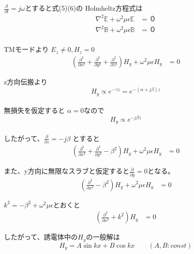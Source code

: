 \documentclass[a4paper,10pt]{bxjsarticle}
\begin{document}
$\frac{\partial}{\partial t} = j\omega$とすると式(5)(6)の Holmheltz方程式は
\begin{align*}
    \nabla^2 \mathbb{E} + \omega^2 \mu \epsilon \mathbb{E} &= ０ \\
    \nabla^2 \mathbb{B} + \omega^2 \mu \epsilon \mathbb{B} &= ０ \\
\end{align*}

TMモードより $E_z \neq 0, H_z = 0$
\begin{align*}
    \left( 
        \frac{\partial^2}{\partial x^2} 
        + \frac{\partial^2}{\partial y^2} 
        + \frac{\partial^2}{\partial z^2} 
    \right) H_y
    + \omega^2 \mu \epsilon H_y
    &= 0    
\end{align*}

z方向伝搬より $$H_y \propto e^{-\gamma z} = e^{-(\alpha + j \beta)z}$$ \\
無損失を仮定すると $\alpha = 0$なので $$H_y \propto e^{ -j \beta z}$$ \\
したがって、$ \frac{\partial}{\partial z} = -j \beta $ とすると
\begin{align*} 
    \left( 
        \frac{\partial^2}{\partial x^2} 
        + \frac{\partial^2}{\partial y^2} 
        - \beta^2 
    \right) H_y
    + \omega^2 \mu \epsilon H_y
    &= 0
\end{align*}

また、y方向に無限なスラブと仮定すると$\frac{\partial}{\partial y} = 0$となる。
\begin{align*} 
    \left( 
        \frac{\partial^2}{\partial x^2} 
        - \beta^2 
    \right) H_y
    + \omega^2 \mu \epsilon H_y
    &= 0
\end{align*}

$k^2 = -\beta^2 + \omega^2 \mu \epsilon$とおくと
\begin{align*} 
    \left( 
        \frac{\partial^2}{\partial x^2} 
        + k^2 
    \right) H_y
    &= 0
\end{align*}

したがって、誘電体中の$H_y$の一般解は
$$ H_y = A \sin k x + B \cos k x \qquad (A,B : const) $$
\end{document}
